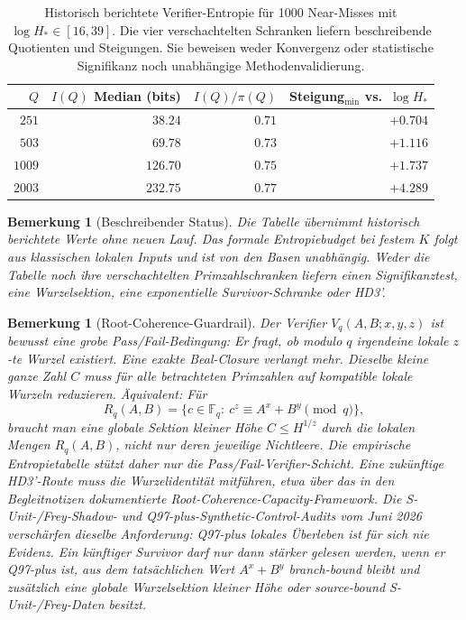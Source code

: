 \documentclass[11pt,a4paper]{article}
\newtheorem{remark}[theorem]{Bemerkung}
\begin{document}
\begin{table}[htb]
\centering
\begin{tabular}{rrrr}
\toprule
$Q$ & $I(Q)$ Median (bits) & $I(Q)/\pi(Q)$ & Steigung$_{\min}$ vs.\ $\log H_*$ \\
\midrule
$251$  & $38.24$  & $0.71$ & $+0.704$ \\
$503$  & $69.78$  & $0.73$ & $+1.116$ \\
$1009$ & $126.70$ & $0.75$ & $+1.737$ \\
$2003$ & $232.75$ & $0.77$ & $+4.289$ \\
\bottomrule
\end{tabular}
\caption{Historisch berichtete Verifier-Entropie für 1000 Near-Misses mit $\log H_*\in[16,39]$. Die vier verschachtelten Schranken liefern beschreibende Quotienten und Steigungen. Sie beweisen weder Konvergenz oder statistische Signifikanz noch unabhängige Methodenvalidierung.}
\label{tab:emp}
\end{table}

\begin{remark}[Beschreibender Status]
Die Tabelle übernimmt historisch berichtete Werte ohne neuen Lauf.
Das formale Entropiebudget bei festem $K$ folgt aus klassischen
lokalen Inputs und ist von den Basen unabhängig.
Weder die Tabelle noch ihre verschachtelten Primzahlschranken
liefern einen Signifikanztest, eine Wurzelsektion, eine exponentielle
Survivor-Schranke oder HD3'.
\end{remark}

\begin{remark}[Root-Coherence-Guardrail]
Der Verifier $V_q(A,B;x,y,z)$ ist bewusst eine grobe Pass/Fail-Bedingung:
Er fragt, ob modulo $q$ irgendeine lokale $z$-te Wurzel existiert. Eine
exakte Beal-Closure verlangt mehr. Dieselbe kleine ganze Zahl $C$ muss für
alle betrachteten Primzahlen auf kompatible lokale Wurzeln reduzieren.
Äquivalent: Für
\[
  R_q(A,B)=\{c\in\mathbb F_q:\ c^z\equiv A^x+B^y\pmod q\},
\]
braucht man eine globale Sektion kleiner Höhe $C\le H^{1/z}$ durch die
lokalen Mengen $R_q(A,B)$, nicht nur deren jeweilige Nichtleere. Die
empirische Entropietabelle stützt daher nur die Pass/Fail-Verifier-Schicht.
Eine zukünftige HD3'-Route muss die Wurzelidentität mitführen, etwa über
das in den Begleitnotizen dokumentierte Root-Coherence-Capacity-Framework.
Die S-Unit-/Frey-Shadow- und Q97-plus-Synthetic-Control-Audits vom Juni
2026 verschärfen dieselbe Anforderung: Q97-plus lokales Überleben ist
für sich nie Evidenz. Ein künftiger Survivor darf nur dann stärker
gelesen werden, wenn er Q97-plus ist, aus dem tatsächlichen Wert
$A^x+B^y$ branch-bound bleibt und zusätzlich eine globale Wurzelsektion
kleiner Höhe oder source-bound S-Unit-/Frey-Daten besitzt.
\end{remark}
\end{document}
